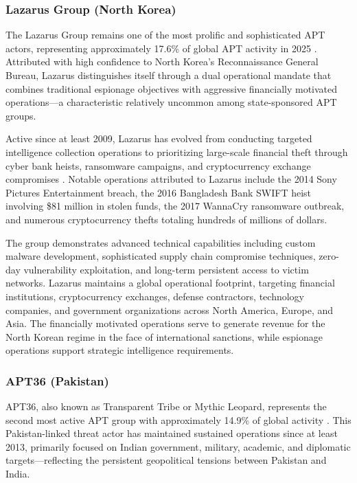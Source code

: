 \subsubsection{Lazarus Group (North Korea)}

The Lazarus Group remains one of the most prolific and sophisticated APT actors, representing approximately 17.6\% of global APT activity in 2025 \cite{trellix2025}. Attributed with high confidence to North Korea's Reconnaissance General Bureau, Lazarus distinguishes itself through a dual operational mandate that combines traditional espionage objectives with aggressive financially motivated operations---a characteristic relatively uncommon among state-sponsored APT groups.

Active since at least 2009, Lazarus has evolved from conducting targeted intelligence collection operations to prioritizing large-scale financial theft through cyber bank heists, ransomware campaigns, and cryptocurrency exchange compromises \cite{socradar2024}. Notable operations attributed to Lazarus include the 2014 Sony Pictures Entertainment breach, the 2016 Bangladesh Bank SWIFT heist involving \$81 million in stolen funds, the 2017 WannaCry ransomware outbreak, and numerous cryptocurrency thefts totaling hundreds of millions of dollars.

The group demonstrates advanced technical capabilities including custom malware development, sophisticated supply chain compromise techniques, zero-day vulnerability exploitation, and long-term persistent access to victim networks. Lazarus maintains a global operational footprint, targeting financial institutions, cryptocurrency exchanges, defense contractors, technology companies, and government organizations across North America, Europe, and Asia. The financially motivated operations serve to generate revenue for the North Korean regime in the face of international sanctions, while espionage operations support strategic intelligence requirements.

\subsubsection{APT36 (Pakistan)}

APT36, also known as Transparent Tribe or Mythic Leopard, represents the second most active APT group with approximately 14.9\% of global activity \cite{trellix2025}. This Pakistan-linked threat actor has maintained sustained operations since at least 2013, primarily focused on Indian government, military, academic, and diplomatic targets---reflecting the persistent geopolitical tensions between Pakistan and India.

